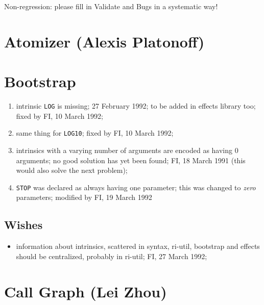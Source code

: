 Non-regression: please fill in Validate and Bugs in a systematic way!

\section{Atomizer (Alexis Platonoff)}

\section{Bootstrap}

\begin{enumerate}

  \item intrinsic \verb+LOG+ is missing; 27 February 1992; to be added
	in effects library too; fixed by FI, 10 March 1992;

  \item same thing for \verb+LOG10+; fixed by FI, 10 March 1992;

  \item intrinsics with a varying number of arguments are encoded
	as having 0 arguments; no good solution has yet been found;
	FI, 18 March 1991 (this would also solve the next problem);

  \item \verb+STOP+ was declared as always having one parameter;
	this was changed to {\em zero} parameters; modified by
	FI, 19 March 1992

\end{enumerate}


\subsection{Wishes}

\begin{itemize}

  \item information about intrinsics, scattered in syntax, ri-util,
	bootstrap and effects should be centralized, probably in
	ri-util; FI, 27 March 1992;

\end{itemize}

\section{Call Graph (Lei Zhou)}

